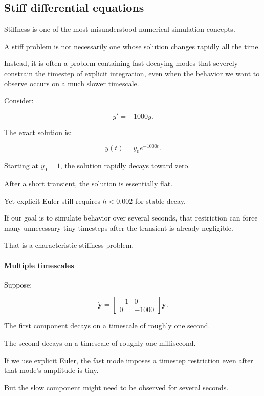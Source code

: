 \subsection{Stiff differential equations}\label{02-foundations-ii-ch025-stiff-differential-equations}

Stiffness is one of the most misunderstood numerical simulation concepts.

A stiff problem is not necessarily one whose solution changes rapidly all the time.

Instead, it is often a problem containing fast-decaying modes that severely constrain the timestep of explicit integration, even when the behavior we want to observe occurs on a much slower timescale.

Consider:

\[
y'=-1000y.
\]

The exact solution is:

\[
y(t)=y_0e^{-1000t}.
\]

Starting at \(y_0=1\), the solution rapidly decays toward zero.

After a short transient, the solution is essentially flat.

Yet explicit Euler still requires \(h<0.002\) for stable decay.

If our goal is to simulate behavior over several seconds, that restriction can force many unnecessary tiny timesteps after the transient is already negligible.

That is a characteristic stiffness problem.

\paragraph{Multiple timescales}\label{02-foundations-ii-ch025-multiple-timescales}

Suppose:

\[
\dot{\mathbf y}= \begin{bmatrix} -1&0\\ 0&-1000 \end{bmatrix}\mathbf y.
\]

The first component decays on a timescale of roughly one second.

The second decays on a timescale of roughly one millisecond.

If we use explicit Euler, the fast mode imposes a timestep restriction even after that mode's amplitude is tiny.

But the slow component might need to be observed for several seconds.

